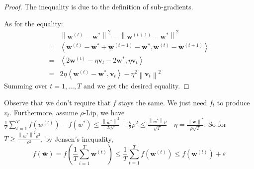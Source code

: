 \documentclass{book}
\newcommand{\nm}[1]{\left\|#1\right\|}
\begin{document}
\begin{proof}
  The inequality is due to the definition of sub-gradients.

  As for the equality: 
\begin{align*}
  &\nm{\mathbf{w}^{\left(t\right)}-\mathbf{w}^{*}}^2-\nm{\mathbf{w}^{(t+1)}-\mathbf{w}^{*}}^2\\ 
  =&\left\langle \mathbf{w}^{(t)}-\mathbf{w}^{*}+\mathbf{w}^{\left( t+1 \right)}-\mathbf{w}^{*},\mathbf{w}^{\left( t \right)}-\mathbf{w}^{\left( t+1 \right)} \right\rangle\\
  =&\left\langle 2\mathbf{w}^{\left( t \right)}-\eta \mathbf{v}_{t}-2\mathbf{w}^{*},\eta \mathbf{v}_{t} \right\rangle\\
  =&2\eta \left\langle \mathbf{w}^{\left( t \right)}-\mathbf{w}^{*},\mathbf{v}_{t} \right\rangle-\eta^2\nm{\mathbf{v}_t}^2
\end{align*}
Summing over $t=1,\dots,T$ and we get the desired equality.
\end{proof}

Observe that we don't require that $f$ stays the same. We just need $f_{t}$ to produce $v_{t}$. Furthermore, assume $\rho$-Lip, we have $\frac{1}{T}\sum_{t=1}^{T}f(w^{(t)})-f(w^{*})\leq \frac{\nm{w^{*}}^{2}}{2\eta T}+\frac{\eta}{2}\rho^{2}\leq \frac{\nm{w^{*}}\rho}{\sqrt{T}}\quad\eta=\frac{\nm{\mathbf{w}}^{*}}{\rho \sqrt{T}}$. So for $T\geq \frac{\nm{w^{*}}^{2}\rho^{2}}{\varepsilon^{2}}$, by Jensen's inequality, %
\begin{equation}
f(\bar{\mathbf{w}})=f \left( \frac{1}{T}\sum_{i=1}^T\mathbf{w}^{(t)} \right)\leq \frac{1}{T}\sum_{t=1}^Tf(\mathbf{w}^{\left( t \right)})\leq f \left( \mathbf{w}^{\left( t \right)} \right)+\varepsilon
\end{equation}
\end{document}
